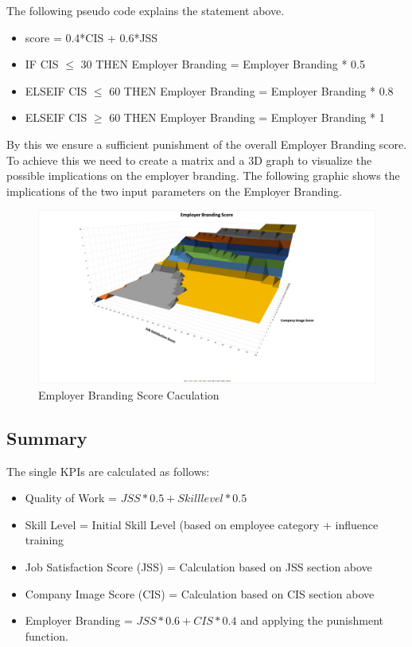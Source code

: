 The following pseudo code explains the statement above.

\begin{itemize}
    \item score = 0.4*CIS + 0.6*JSS
    \item IF CIS $\leq$ 30 THEN Employer Branding = Employer Branding * 0.5
    \item ELSEIF CIS $\leq$ 60 THEN Employer Branding = Employer Branding * 0.8
    \item ELSEIF CIS $\geq$ 60 THEN Employer Branding = Employer Branding * 1
\end{itemize}

By this we ensure a sufficient punishment of the overall Employer Branding score. To achieve this we need to create a matrix and a 3D graph to visualize the possible implications on the employer branding. The following graphic shows the implications of the two input parameters on the Employer Branding.

\begin{figure}
	\centering
	\includegraphics[width=12.5cm]{images/EBS.jpg}
	\caption{Employer Branding Score Caculation}
	\label{img:EBS}
\end{figure}

\subsection{Summary}

The single KPIs are calculated as follows: 
\begin{itemize}
\item Quality of Work = $JSS * 0.5 + Skilllevel * 0.5$
\item Skill Level = Initial Skill Level (based on employee category + influence training
\item Job Satisfaction Score (JSS) = Calculation based on JSS section above
\item Company Image Score (CIS) = Calculation based on CIS section above
\item Employer Branding = $JSS*0.6 + CIS*0.4$ and applying the punishment function. 
\end{itemize}